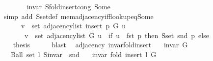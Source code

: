 \begin{isabellebody}
\ \ \ \ \ \ \isamarkupfalse%
\ invar\ S{\isachardot}{\kern0pt}fold{\isacharunderscore}{\kern0pt}insert{\isacharunderscore}{\kern0pt}cong\ Some\isanewline
\ \ \ \ \ \ \isamarkupfalse%
\ {\isacharparenleft}{\kern0pt}simp\ add{\isacharcolon}{\kern0pt}\ S{\isachardot}{\kern0pt}set{\isacharunderscore}{\kern0pt}def\ mem{\isacharunderscore}{\kern0pt}adjacency{\isacharunderscore}{\kern0pt}iff{\isacharunderscore}{\kern0pt}lookup{\isacharunderscore}{\kern0pt}eq{\isacharunderscore}{\kern0pt}Some{\isacharparenright}{\kern0pt}\isanewline
\ \ \ \ \isamarkupfalse%
\ \isamarkupfalse%
\isanewline
\ \ \ \ \ \ {\isachardoublequoteopen}v\ {\isasymin}\ set\ {\isacharparenleft}{\kern0pt}adjacency{\isacharunderscore}{\kern0pt}list\ {\isacharparenleft}{\kern0pt}insert{\isacharunderscore}{\kern0pt}{}\ p\ G{\isacharparenright}{\kern0pt}\ u{\isacharparenright}{\kern0pt}\ {\isasymlongleftrightarrow}\isanewline
\ \ \ \ \ \ \ v\ {\isasymin}\ set\ {\isacharparenleft}{\kern0pt}adjacency{\isacharunderscore}{\kern0pt}list\ G\ u{\isacharparenright}{\kern0pt}\ {\isasymunion}\ {\isacharparenleft}{\kern0pt}if\ u\ {\isacharequal}{\kern0pt}\ fst\ p\ then\ S{\isachardot}{\kern0pt}set\ {\isacharparenleft}{\kern0pt}snd\ p{\isacharparenright}{\kern0pt}\ else\ {\isacharbraceleft}{\kern0pt}{\isacharbraceright}{\kern0pt}{\isacharparenright}{\kern0pt}{\isachardoublequoteclose}\isanewline
\ \ \ \ \ \ \isacommand{{\isachardot}{\kern0pt}}\isamarkupfalse%
\ \isacommand{{\isacharbraceright}{\kern0pt}}\isamarkupfalse%
\isanewline
\ \ \isamarkupfalse%
\ {\isacharquery}{\kern0pt}thesis\isanewline
\ \ \ \ \isamarkupfalse%
\ blast\isanewline
{}\isamarkupfalse%
%
\endisatagproof
{\isafoldproof}%
%
\isadelimproof
\isanewline
%
\endisadelimproof
\isanewline
{}\isamarkupfalse%
\ {\isacharparenleft}{\kern0pt}\ adjacency{\isacharparenright}{\kern0pt}\ invar{\isacharunderscore}{\kern0pt}fold{\isacharunderscore}{\kern0pt}insert{\isacharunderscore}{\kern0pt}{}{\isacharcolon}{\kern0pt}\isanewline
\ \ \ {\isachardoublequoteopen}invar\ G{\isachardoublequoteclose}\isanewline
\ \ \ {\isachardoublequoteopen}Ball\ {\isacharparenleft}{\kern0pt}set\ l{\isacharparenright}{\kern0pt}\ {\isacharparenleft}{\kern0pt}S{\isachardot}{\kern0pt}invar\ {\isasymcirc}\ snd{\isacharparenright}{\kern0pt}{\isachardoublequoteclose}\isanewline
\ \ \ {\isachardoublequoteopen}invar\ {\isacharparenleft}{\kern0pt}fold\ insert{\isacharunderscore}{\kern0pt}{}\ l\ G{\isacharparenright}{\kern0pt}{\isachardoublequoteclose}\isanewline

\end{isabellebody}
